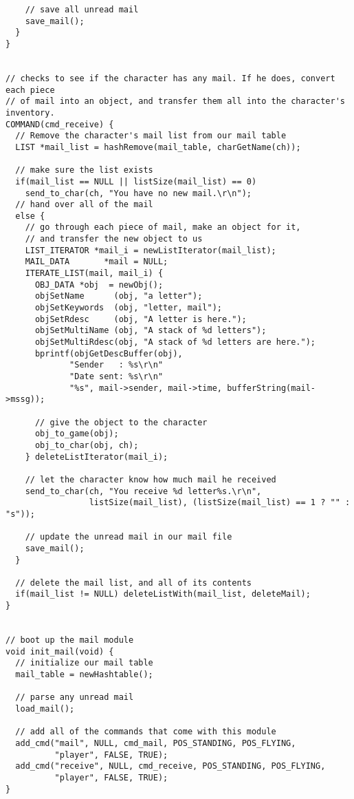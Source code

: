 \documentclass[12pt]{article}
\begin{document}
{\begin{verbatim}
    // save all unread mail
    save_mail();
  }
}


// checks to see if the character has any mail. If he does, convert each piece
// of mail into an object, and transfer them all into the character's inventory.
COMMAND(cmd_receive) {
  // Remove the character's mail list from our mail table
  LIST *mail_list = hashRemove(mail_table, charGetName(ch));

  // make sure the list exists
  if(mail_list == NULL || listSize(mail_list) == 0)
    send_to_char(ch, "You have no new mail.\r\n");
  // hand over all of the mail
  else {
    // go through each piece of mail, make an object for it, 
    // and transfer the new object to us
    LIST_ITERATOR *mail_i = newListIterator(mail_list);
    MAIL_DATA       *mail = NULL;
    ITERATE_LIST(mail, mail_i) {
      OBJ_DATA *obj  = newObj();
      objSetName      (obj, "a letter");
      objSetKeywords  (obj, "letter, mail");
      objSetRdesc     (obj, "A letter is here.");
      objSetMultiName (obj, "A stack of %d letters");
      objSetMultiRdesc(obj, "A stack of %d letters are here.");
      bprintf(objGetDescBuffer(obj),
             "Sender   : %s\r\n"
             "Date sent: %s\r\n"
             "%s", mail->sender, mail->time, bufferString(mail->mssg));
      
      // give the object to the character
      obj_to_game(obj);
      obj_to_char(obj, ch);
    } deleteListIterator(mail_i);

    // let the character know how much mail he received
    send_to_char(ch, "You receive %d letter%s.\r\n", 
                 listSize(mail_list), (listSize(mail_list) == 1 ? "" : "s"));

    // update the unread mail in our mail file
    save_mail();
  }

  // delete the mail list, and all of its contents
  if(mail_list != NULL) deleteListWith(mail_list, deleteMail);
}


// boot up the mail module
void init_mail(void) {
  // initialize our mail table
  mail_table = newHashtable();

  // parse any unread mail
  load_mail();

  // add all of the commands that come with this module
  add_cmd("mail", NULL, cmd_mail, POS_STANDING, POS_FLYING,
          "player", FALSE, TRUE);
  add_cmd("receive", NULL, cmd_receive, POS_STANDING, POS_FLYING,
          "player", FALSE, TRUE);
}
\end{verbatim}}
\end{document}

